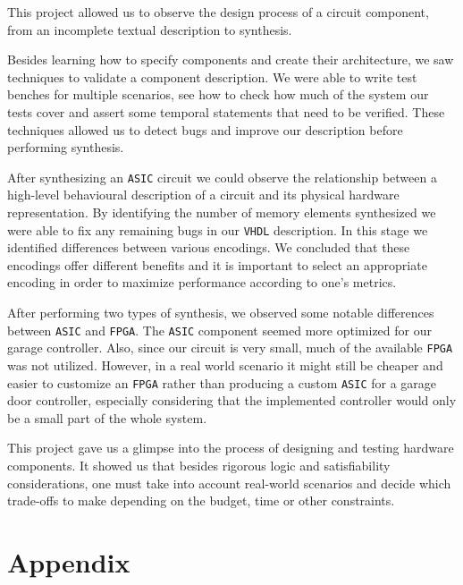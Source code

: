 \documentclass[a4paper,11pt]{article}
\begin{document}
	\par This project allowed us to observe the design process of a circuit component, from an incomplete textual description to synthesis.
	\par Besides learning how to specify components and create their architecture, we saw techniques to validate a component description. We were able to write test benches for multiple scenarios, see how to check how much of the system our tests cover and assert some temporal statements that need to be verified. These techniques allowed us to detect bugs and improve our description before performing synthesis.
	\par After synthesizing an \texttt{ASIC} circuit we could observe the relationship between a high-level behavioural description of a circuit and its physical hardware representation. By identifying the number of memory elements synthesized we were able to fix any remaining bugs in our \texttt{VHDL} description. In this stage we identified differences between various encodings. We concluded that these encodings offer different benefits and it is important to select an appropriate encoding in order to maximize performance according to one's metrics.
	\par After performing two types of synthesis, we observed some notable differences between \texttt{ASIC} and \texttt{FPGA}. The \texttt{ASIC} component seemed more optimized for our garage controller. Also, since our circuit is very small, much of the available \texttt{FPGA} was not utilized. However, in a real world scenario it might still be cheaper and easier to customize an \texttt{FPGA} rather than producing a custom \texttt{ASIC} for a garage door controller, especially considering that the implemented controller would only be a small part of the whole system.
	\par This project gave us a glimpse into the process of designing and testing hardware components. It showed us that besides rigorous logic and satisfiability considerations, one must take into account real-world scenarios and decide which trade-offs to make depending on the budget, time or other constraints.

    \newpage
    \section{Appendix}
    
\end{document}
